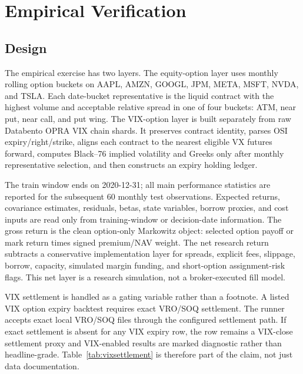 
\section{Empirical Verification}

\subsection{Design}

The empirical exercise has two layers. The equity-option layer uses monthly rolling option
buckets on AAPL, AMZN, GOOGL, JPM, META, MSFT, NVDA, and TSLA. Each date-bucket
representative is the liquid contract with the highest volume and acceptable relative
spread in one of four buckets: ATM, near put, near call, and put wing. The VIX-option
layer is built separately from raw Databento OPRA VIX chain shards. It preserves contract
identity, parses OSI expiry/right/strike, aligns each contract to the nearest eligible VX
futures forward, computes Black--76 implied volatility and Greeks only after monthly
representative selection, and then constructs an expiry holding ledger.

The train window ends on 2020-12-31; all main performance statistics are reported for the
subsequent 60 monthly test observations. Expected returns, covariance estimates, residuals,
betas, state variables, borrow proxies, and cost inputs are read only from training-window
or decision-date information. The gross return is the clean option-only Markowitz object:
selected option payoff or mark return times signed premium/NAV weight. The net research
return subtracts a conservative implementation layer for spreads, explicit fees, slippage,
borrow, capacity, simulated margin funding, and short-option assignment-risk flags. This
net layer is a research simulation, not a broker-executed fill model.

VIX settlement is handled as a gating variable rather than a footnote. A listed VIX option
expiry backtest requires exact VRO/SOQ settlement. The runner accepts exact local VRO/SOQ
files through the configured settlement path. If exact settlement is absent for any VIX
expiry row, the row remains a VIX-close settlement proxy and VIX-enabled results are marked
diagnostic rather than headline-grade. Table~\ref{tab:vixsettlement} is therefore part of
the claim, not just data documentation.

\begin{table}[H]
\centering
\resizebox{0.94\textwidth}{!}{}
\caption{Data, timing, settlement, and post-cost construction summary generated by the
empirical runner.}
\label{tab:empirical_data}
\end{table}

